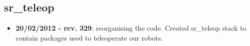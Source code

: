
\subsection{sr\_teleop}
\label{sec:sr-teleop-changelog}

\begin{itemize}
\item \textbf{20/02/2012 - rev. 329}: reorganising the code. Created sr\_teleop stack to contain packages used to teleoperate our robots.
\end{itemize}